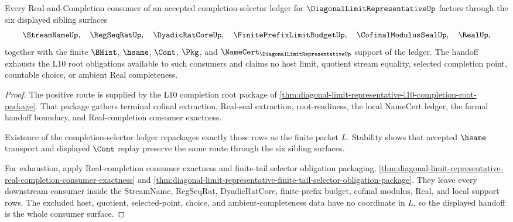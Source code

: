 \begin{theorem}
\label{thm:diagonal-limit-representative-completion-handoff-exhaustion}
Every Real-and-Completion consumer of an accepted completion-selector ledger for $\DiagonalLimitRepresentativeUp$ factors through the six displayed sibling surfaces
$$
\StreamNameUp,\quad \RegSeqRatUp,\quad \DyadicRatCoreUp,\quad \FinitePrefixLimitBudgetUp,\quad \CofinalModulusSealUp,\quad \RealUp,
$$
together with the finite $\BHist$, $\hsame$, $\Cont$, $\Pkg$, and $\NameCert_{\DiagonalLimitRepresentativeUp}$ support of the ledger. The handoff exhausts the L10 root obligations available to such consumers and claims no host limit, quotient stream equality, selected completion point, countable choice, or ambient Real completeness.
\end{theorem}
\begin{proof}
The positive route is supplied by the L10 completion root package of \autoref{thm:diagonal-limit-representative-l10-completion-root-package}. That package gathers terminal cofinal extraction, Real-seal extraction, root-readiness, the local NameCert ledger, the formal handoff boundary, and Real-completion consumer exactness.

Existence of the completion-selector ledger repackages exactly those rows as the finite packet $L$. Stability shows that accepted $\hsame$ transport and displayed $\Cont$ replay preserve the same route through the six sibling surfaces.

For exhaustion, apply Real-completion consumer exactness and finite-tail selector obligation packaging, \autoref{thm:diagonal-limit-representative-real-completion-consumer-exactness} and \autoref{thm:diagonal-limit-representative-finite-tail-selector-obligation-package}. They leave every downstream consumer inside the StreamName, RegSeqRat, DyadicRatCore, finite-prefix budget, cofinal modulus, Real, and local support rows. The excluded host, quotient, selected-point, choice, and ambient-completeness data have no coordinate in $L$, so the displayed handoff is the whole consumer surface.
\end{proof}
